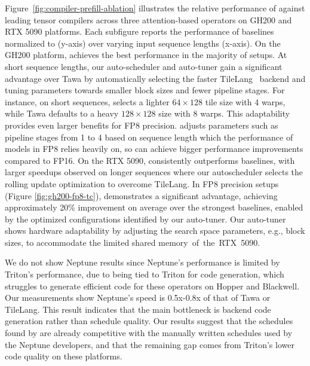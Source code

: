 Figure~\ref{fig:compiler-prefill-ablation} illustrates the relative performance of
\NAME{} against leading tensor compilers across three attention-based operators on GH200
and RTX 5090 platforms.
Each subfigure reports the performance of baselines normalized to \NAME{} (y-axis) over
varying input sequence lengths (x-axis).
On the GH200 platform, \NAME{} achieves the best performance in the majority of setups.
At short sequence lengths, our auto-scheduler and auto-tuner gain a significant advantage
over Tawa by automatically selecting the faster TileLang~\cite{tilelang} backend and
tuning parameters towards smaller block sizes and fewer pipeline stages.
%
For instance, on short sequences, \NAME{} selects a lighter $64 \times 128$ tile size
with 4 warps, while Tawa defaults to a heavy $128 \times 128$ size with 8 warps.
This adaptability provides even larger benefits for FP8 precision. \NAME{} adjusts
parameters such as pipeline stages from 1 to 4 based on sequence length which the
performance of models in FP8 relies heavily on, so \NAME{} can achieve bigger performance
improvements compared to FP16.
%
On the RTX 5090, \NAME{} consistently outperforms baselines, with larger speedups
observed on longer sequences where our autoscheduler selects the rolling update
optimization to overcome TileLang.
In FP8 precision setups (Figure \ref{fig:gh200-fp8-tc}), \NAME{} demonstrates a
significant advantage, achieving \mbox{approximately} 20\% improvement on average over the
strongest baselines, enabled by the optimized \mbox{configurations} identified by our auto-tuner.
%
Our auto-tuner shows hardware adaptability by adjusting the search space parameters, e.g., block sizes, to accommodate the limited shared \mbox{memory of the RTX 5090.}

We do not show Neptune results since Neptune's performance is limited by Triton's performance,
due to being tied to Triton for code generation, which struggles to generate efficient code for these
operators on Hopper and Blackwell.
Our measurements show Neptune's speed is 0.5x-0.8x of that of Tawa or TileLang. %
This result indicates that the main bottleneck is backend code generation rather than schedule quality. Our results suggest that the schedules found by \NAME{} are already competitive with the manually written schedules used by the Neptune developers, and that the remaining gap comes from Triton's lower code quality on these platforms.

